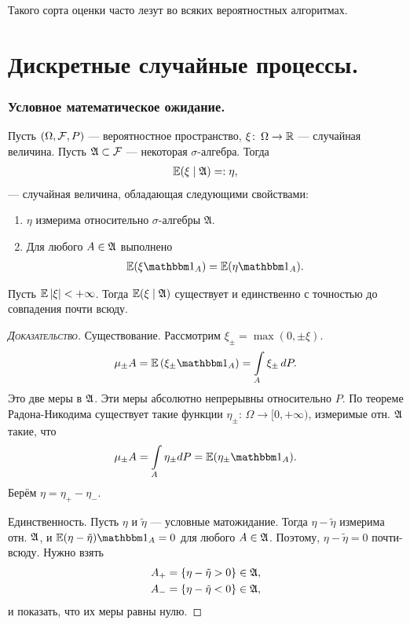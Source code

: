 \documentclass[../main.tex]{subfiles}
\begin{document}
Такого сорта оценки часто лезут во всяких вероятностных алгоритмах.

\newpage
\part{Дискретные случайные процессы.}
\section{Условное математическое ожидание.}
\begin{df}
 Пусть $ (\Omega, \mathcal F, P) $ --- вероятностное пространство, $ \xi \colon \, \Omega \to \mathbb{R} $ --- случайная величина. Пусть $ \mathfrak A \subset \mathcal F $ --- некоторая $ \sigma $-алгебра. Тогда
 \begin{align*}
  \mathbb E(\xi \mid \mathfrak A) =: \eta,
 \end{align*} --- случайная величина, обладающая следующими свойствами:
 \begin{enumerate}
  \item $ \eta $ измерима относительно $ \sigma $-алгебры $ \mathfrak A $.
  \item Для любого $ A \in \mathfrak A $ выполнено
   \begin{align*}
    \E(\xi \Ind_A) = \E(\eta \Ind_A).
   \end{align*}
 \end{enumerate}
\end{df}
\begin{thm}
 Пусть $ \mathbb E \left| \xi \right| < +\infty $. Тогда $ \mathbb E(\xi\mid\mathfrak A) $ существует и единственно с точностью до совпадения почти всюду.
\end{thm}
\begin{proof}[\normalfont\textsc{Доказательство}]
 Существование. Рассмотрим $ \xi_\pm = \max(0, \pm \xi) $.
 \begin{align*}
  \mu_\pm A = \E \left( \xi_\pm \Ind_A \right) = \int\limits_{A} \xi_\pm \,dP. 
 \end{align*} Это две меры в $ \mathfrak A $. Эти меры абсолютно непрерывны относительно $ P $. По теореме Радона-Никодима существует такие функции $ \eta_\pm \colon\, \Omega \to [0, +\infty)  $, измеримые отн. $ \mathfrak A $ такие, что
 \begin{align*}
  \mu_\pm A = \int\limits_{A} \eta_\pm dP = \E (\eta_\pm \Ind_A).
 \end{align*} Берём $ \eta = \eta_+ - \eta_- $.

 Единственность. Пусть $ \eta  $ и $ \tilde \eta $ --- условные матожидание. Тогда
 $ \eta - \tilde \eta $ измерима отн. $ \mathfrak A $, и $ \E(\eta-\tilde\eta) \Ind_A = 0 $ для любого $ A \in \mathfrak A $. Поэтому, $ \eta - \tilde\eta = 0 $ почти-всюду. Нужно взять
 \begin{align*}
  A_+ &= \left\{ \eta - \tilde\eta > 0 \right\} \in \mathfrak A, \\
  A_- &= \left\{ \eta - \tilde\eta < 0 \right\} \in \mathfrak A,
 \end{align*} и показать, что их меры равны нулю.
\end{proof}
\end{document}
